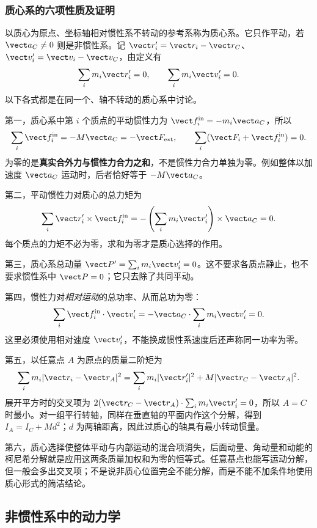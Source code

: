 \subsubsection{质心系的六项性质及证明}
\label{r2ch02:sec:cm-properties}

以质心为原点、坐标轴相对惯性系不转动的参考系称为质心系。它只作平动，若 $\vect a_C\ne0$ 则是非惯性系。记 $\vect r_i'=\vect r_i-\vect r_C$、$\vect v_i'=\vect v_i-\vect v_C$，由定义有
\[
 \sum_i m_i\vect r_i'=0,\qquad
 \sum_i m_i\vect v_i'=0.
\]
以下各式都是在同一个、轴不转动的质心系中讨论。

第一，质心系中第 $i$ 个质点的平动惯性力为 $\vect f_i^{\rm in}=-m_i\vect a_C$，所以
\[
 \sum_i\vect f_i^{\rm in}=-M\vect a_C=-\vect F_{\rm ext},\qquad
 \sum_i(\vect F_i+\vect f_i^{\rm in})=0.
\]
为零的是\textbf{真实合外力与惯性力合力之和}，不是惯性力合力单独为零。例如整体以加速度 $\vect a_C$ 运动时，后者恰好等于 $-M\vect a_C$。

第二，平动惯性力对质心的总力矩为
\[
 \sum_i\vect r_i'\times\vect f_i^{\rm in}
 =-\left(\sum_i m_i\vect r_i'\right)\times\vect a_C=0.
\]
每个质点的力矩不必为零，求和为零才是质心选择的作用。

第三，质心系总动量 $\vect P'=\sum_i m_i\vect v_i'=0$。这不要求各质点静止，也不要求惯性系中 $\vect P=0$；它只去除了共同平动。

第四，惯性力对\emph{相对运动}的总功率、从而总功为零：
\[
 \sum_i\vect f_i^{\rm in}\cdot\vect v_i'
 =-\vect a_C\cdot\sum_i m_i\vect v_i'=0.
\]
这里必须使用相对速度 $\vect v_i'$，不能换成惯性系速度后还声称同一功率为零。

第五，以任意点 $A$ 为原点的质量二阶矩为
\[
 \sum_i m_i|\vect r_i-\vect r_A|^2
 =\sum_i m_i|\vect r_i'|^2+M|\vect r_C-\vect r_A|^2.
\]
展开平方时的交叉项为 $2(\vect r_C-\vect r_A)\cdot\sum_i m_i\vect r_i'=0$，所以 $A=C$ 时最小。对一组平行转轴，同样在垂直轴的平面内作这个分解，得到 $I_A=I_C+Md^2$；$d$ 为两轴距离，因此过质心的轴具有最小转动惯量。

第六，质心选择使整体平动与内部运动的混合项消失，后面动量、角动量和动能的柯尼希分解就是应用这两条质量加权和为零的恒等式。任意基点也能写运动分解，但一般会多出交叉项；不是说非质心位置完全不能分解，而是不能不加条件地使用质心形式的简洁结论。

\subsection{非惯性系中的动力学}
\label{r2ch02:sec:noninertial}

